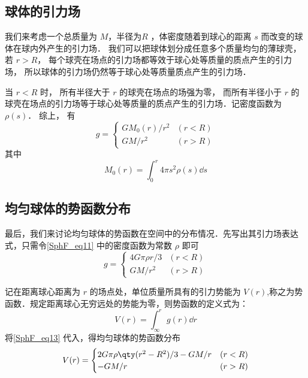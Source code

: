 \subsection{球体的引力场}
我们来考虑一个总质量为 $M$，半径为$R$ ，体密度随着到球心的距离 $s$ 而改变的球体在球内外产生的引力场． 我们可以把球体划分成任意多个质量均匀的薄球壳， 若 $r > R$， 每个球壳在场点的引力场都等效于球心处等质量的质点产生的引力场， 所以球体的引力场仍然等于球心处等质量质点产生的引力场．

当 $r < R$ 时， 所有半径大于 $r$ 的球壳在场点的场强为零， 而所有半径小于 $r$ 的球壳在场点的引力场等于球心处等质量的质点产生的引力场．记密度函数为 $\rho(s)$． 综上， 有
\begin{equation}\label{SphF_eq11}
g =
\begin{cases}
GM_0(r)/r^2 &(r < R)\\
GM/r^2 & (r > R)
\end{cases}
\end{equation}
其中
\begin{equation}
M_0(r) = \int_0^r 4\pi s^2 \rho(s) \dd{s}
\end{equation}

\subsection{均匀球体的势函数分布}
最后，我们来讨论均匀球体的势函数在空间中的分布情况．先写出其引力场表达式，只需令\autoref{SphF_eq11}  中的密度函数为常数 $\rho$ 即可
\begin{equation}\label{SphF_eq13}
g =
\begin{cases}
4G\pi \rho r/3  &(r < R)\\
GM/r^2 & (r > R)
\end{cases}
\end{equation}

记在距离球心距离为 $r$ 的场点处，单位质量所具有的引力势能为 $V(r)$,称之为势函数．规定距离球心无穷远处的势能为零，则势函数的定义式为：
\begin{equation}
V(r) = \int_\infty^r g(r) \dd{r}
\end{equation}
将\autoref{SphF_eq13} 代入，得均匀球体的势函数分布
\begin{equation}
V(r) =
\begin{cases}
2G\pi \rho \qty(r^2-R^2)/3 - GM/r  &(r < R)\\
-GM/r & (r > R)
\end{cases}
\end{equation}
